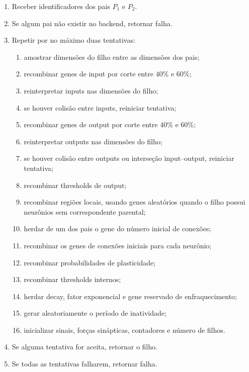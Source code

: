 \documentclass[12pt,a4paper,fleqn]{article}
\begin{document}
\begin{enumerate}
	\item Receber identificadores dos pais $P_1$ e $P_2$.
	\item Se algum pai não existir no backend, retornar falha.
	\item Repetir por no máximo duas tentativas:
	\begin{enumerate}
		\item amostrar dimensões do filho entre as dimensões dos pais;
		\item recombinar genes de input por corte entre $40\%$ e $60\%$;
		\item reinterpretar inputs nas dimensões do filho;
		\item se houver colisão entre inputs, reiniciar tentativa;
		\item recombinar genes de output por corte entre $40\%$ e $60\%$;
		\item reinterpretar outputs nas dimensões do filho;
		\item se houver colisão entre outputs ou interseção input--output, reiniciar tentativa;
		\item recombinar thresholds de output;
		\item recombinar regiões locais, usando genes aleatórios quando o filho possui neurônios sem correspondente parental;
		\item herdar de um dos pais o gene do número inicial de conexões;
		\item recombinar os genes de conexões iniciais para cada neurônio;
		\item recombinar probabilidades de plasticidade;
		\item recombinar thresholds internos;
		\item herdar decay, fator exponencial e gene reservado de enfraquecimento;
		\item gerar aleatoriamente o período de inatividade;
		\item inicializar sinais, forças sinápticas, contadores e número de filhos.
	\end{enumerate}
	\item Se alguma tentativa for aceita, retornar o filho.
	\item Se todas as tentativas falharem, retornar falha.
\end{enumerate}
\end{document}
